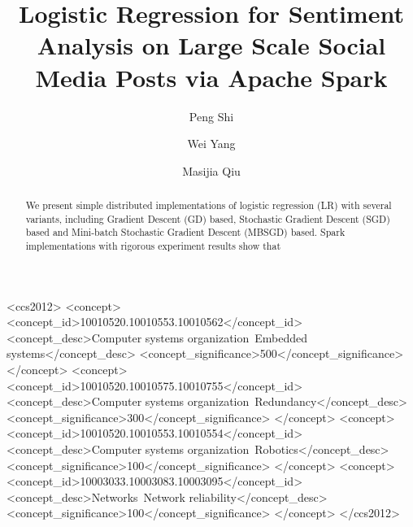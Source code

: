 \documentclass[sigconf]{acmart}
\begin{document}
\title{Logistic Regression for Sentiment Analysis on Large Scale Social Media Posts via Apache Spark}


\author{Peng Shi}

\author{Wei Yang}

\author{Masijia Qiu}




\begin{abstract}

We present simple distributed implementations of logistic regression (LR) with several variants, including Gradient Descent (GD) based, Stochastic Gradient Descent (SGD) based and Mini-batch Stochastic Gradient Descent (MBSGD) based. Spark implementations with rigorous experiment results show that

\end{abstract}
%
%
\begin{CCSXML}
<ccs2012>
 <concept>
  <concept_id>10010520.10010553.10010562</concept_id>
  <concept_desc>Computer systems organization~Embedded systems</concept_desc>
  <concept_significance>500</concept_significance>
 </concept>
 <concept>
  <concept_id>10010520.10010575.10010755</concept_id>
  <concept_desc>Computer systems organization~Redundancy</concept_desc>
  <concept_significance>300</concept_significance>
 </concept>
 <concept>
  <concept_id>10010520.10010553.10010554</concept_id>
  <concept_desc>Computer systems organization~Robotics</concept_desc>
  <concept_significance>100</concept_significance>
 </concept>
 <concept>
  <concept_id>10003033.10003083.10003095</concept_id>
  <concept_desc>Networks~Network reliability</concept_desc>
  <concept_significance>100</concept_significance>
 </concept>
</ccs2012>
\end{CCSXML}



\maketitle
\end{document}
